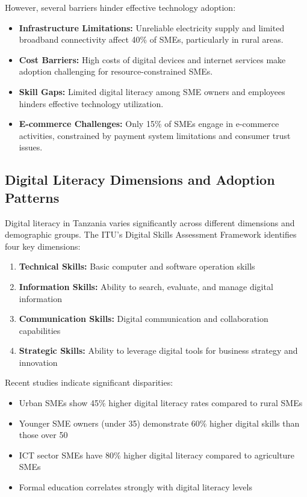 However, several barriers hinder effective technology adoption:
\begin{itemize}
    \item \textbf{Infrastructure Limitations:} Unreliable electricity supply and limited broadband connectivity affect 40\% of SMEs, particularly in rural areas.
    \item \textbf{Cost Barriers:} High costs of digital devices and internet services make adoption challenging for resource-constrained SMEs.
    \item \textbf{Skill Gaps:} Limited digital literacy among SME owners and employees hinders effective technology utilization.
    \item \textbf{E-commerce Challenges:} Only 15\% of SMEs engage in e-commerce activities, constrained by payment system limitations and consumer trust issues.
\end{itemize}

\subsection{Digital Literacy Dimensions and Adoption Patterns}

Digital literacy in Tanzania varies significantly across different dimensions and demographic groups. The ITU's Digital Skills Assessment Framework identifies four key dimensions:

\begin{enumerate}
    \item \textbf{Technical Skills:} Basic computer and software operation skills
    \item \textbf{Information Skills:} Ability to search, evaluate, and manage digital information
    \item \textbf{Communication Skills:} Digital communication and collaboration capabilities
    \item \textbf{Strategic Skills:} Ability to leverage digital tools for business strategy and innovation
\end{enumerate}

Recent studies indicate significant disparities:
\begin{itemize}
    \item Urban SMEs show 45\% higher digital literacy rates compared to rural SMEs
    \item Younger SME owners (under 35) demonstrate 60\% higher digital skills than those over 50
    \item ICT sector SMEs have 80\% higher digital literacy compared to agriculture SMEs
    \item Formal education correlates strongly with digital literacy levels
\end{itemize}

